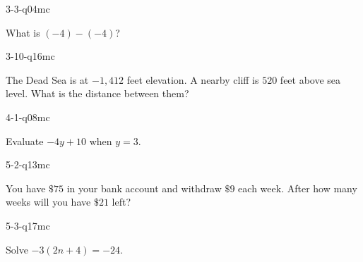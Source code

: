 \begin{practiceQuestion}{3-3-q04}{mc}
\begin{questionText}
What is $(-4) - (-4)$?
\end{questionText}
\end{practiceQuestion}

\begin{practiceQuestion}{3-10-q16}{mc}
\begin{questionText}
The Dead Sea is at $-1{,}412$ feet elevation. A nearby cliff is $520$ feet above sea level. What is the distance between them?
\end{questionText}
\end{practiceQuestion}

\begin{practiceQuestion}{4-1-q08}{mc}
\begin{questionText}
Evaluate $-4y + 10$ when $y = 3$.
\end{questionText}
\end{practiceQuestion}

\begin{practiceQuestion}{5-2-q13}{mc}
\begin{questionText}
You have $\$75$ in your bank account and withdraw $\$9$ each week. After how many weeks will you have $\$21$ left?
\end{questionText}
\end{practiceQuestion}

\begin{practiceQuestion}{5-3-q17}{mc}
\begin{questionText}
Solve $-3(2n + 4) = -24$.
\end{questionText}
\end{practiceQuestion}

